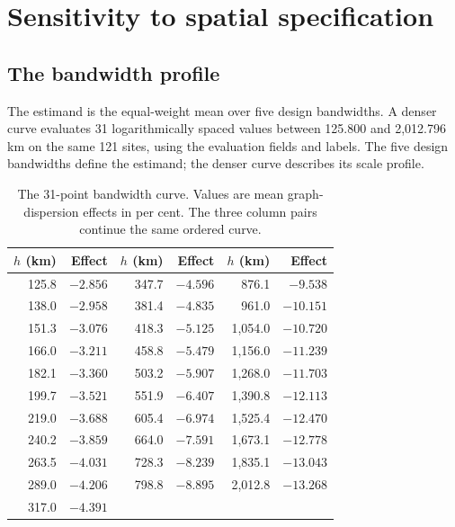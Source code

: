 \documentclass[namedate,webpdf,modern,mediumone]{oup-authoring-template}
\theoremstyle{thmstyleone}
\begin{document}
\section{Sensitivity to spatial specification}
\label{sec:resolution}

\subsection{The bandwidth profile}

The estimand is the equal-weight mean over five design bandwidths. A denser
curve evaluates 31 logarithmically spaced values between 125.800 and 2,012.796 km on
the same 121 sites, using the evaluation fields and labels. The five design
bandwidths define the estimand; the denser curve describes its scale profile.

\begin{table}[htbp]
\centering
\caption{The 31-point bandwidth curve. Values are mean
graph-dispersion effects in per cent. The three column pairs continue the same
ordered curve.}
\label{tab:dense-bandwidth}
\footnotesize
\setlength{\tabcolsep}{6pt}
\begin{tabular}{rr@{\qquad}rr@{\qquad}rr}
\toprule
$h$ (km) & Effect & $h$ (km) & Effect & $h$ (km) & Effect \\
\midrule
125.8 & $-2.856$ & 347.7 & $-4.596$ & 876.1  & $-9.538$ \\
138.0 & $-2.958$ & 381.4 & $-4.835$ & 961.0  & $-10.151$ \\
151.3 & $-3.076$ & 418.3 & $-5.125$ & 1,054.0 & $-10.720$ \\
166.0 & $-3.211$ & 458.8 & $-5.479$ & 1,156.0 & $-11.239$ \\
182.1 & $-3.360$ & 503.2 & $-5.907$ & 1,268.0 & $-11.703$ \\
199.7 & $-3.521$ & 551.9 & $-6.407$ & 1,390.8 & $-12.113$ \\
219.0 & $-3.688$ & 605.4 & $-6.974$ & 1,525.4 & $-12.470$ \\
240.2 & $-3.859$ & 664.0 & $-7.591$ & 1,673.1 & $-12.778$ \\
263.5 & $-4.031$ & 728.3 & $-8.239$ & 1,835.1 & $-13.043$ \\
289.0 & $-4.206$ & 798.8 & $-8.895$ & 2,012.8 & $-13.268$ \\
317.0 & $-4.391$ &       &          &         &          \\
\bottomrule
\end{tabular}
\end{table}
\end{document}
